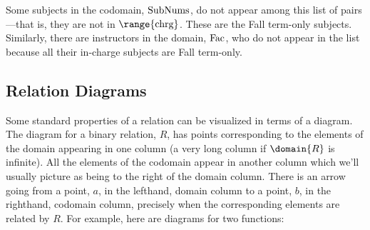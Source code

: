 \iffalse
This is a surprisingly complicated relation: Meyer is in charge of
subjects with three numbers.  Leighton is also in charge of subjects with
two of these three numbers ---because the same subject, Mathematics for
Computer Science, has two numbers: 6.042 and 18.062, and Meyer and
Leighton are co-in-charge of the subject.  Freeman is in-charge of even
more subjects numbers (around 20), since as Department Education Officer,
he is in charge of whole blocks of special subject numbers.  Some
subjects, like 6.844 and 6.00 have only one person in-charge.  Some
faculty, like Guttag, are in charge of only one subject number, and no one
else is co-in-charge of his subject, 6.00.
\fi

Some subjects in the codomain, $\text{SubNums}$, do not appear among this list
of pairs ---that is, they are not in $\range{\inchrg}$.  These are the Fall
term-only subjects.  Similarly, there are instructors in the domain,
$\text{Fac}$, who do not appear in the list because all their in-charge
subjects are Fall term-only.

\subsection{Relation Diagrams}
Some standard properties of a relation can be visualized in terms of a
diagram.  The diagram for a binary relation, $R$, has points corresponding
to the elements of the domain appearing in one column (a very long column if
$\domain{R}$ is infinite).  All the elements of the codomain appear in
another column which we'll usually picture as being to the right of the
domain column.  There is an arrow going from a point, $a$, in the
lefthand, domain column to a point, $b$, in the righthand, codomain
column, precisely when the corresponding elements are related by $R$.  For
example, here are diagrams for two functions:

